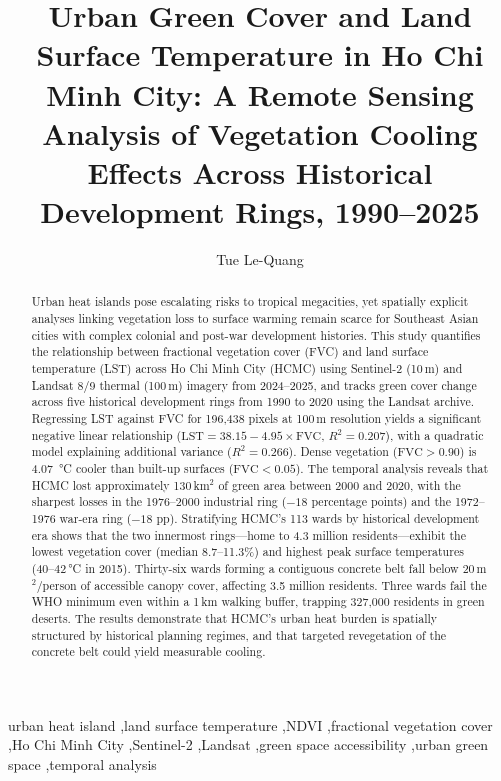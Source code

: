 \documentclass[preprint,12pt]{elsarticle}
\begin{document}
\begin{frontmatter}

\title{Urban Green Cover and Land Surface Temperature in Ho Chi Minh City: A Remote Sensing Analysis of Vegetation Cooling Effects Across Historical Development Rings, 1990--2025}

\author[fulbright]{Tue Le-Quang}

\address[fulbright]{Urban Social Economics Research Group, Fulbright University Vietnam, Ho Chi Minh City, Vietnam}

\begin{abstract}
Urban heat islands pose escalating risks to tropical megacities, yet spatially explicit analyses linking vegetation loss to surface warming remain scarce for Southeast Asian cities with complex colonial and post-war development histories. This study quantifies the relationship between fractional vegetation cover (FVC) and land surface temperature (LST) across Ho Chi Minh City (HCMC) using Sentinel-2 (10\,m) and Landsat 8/9 thermal (100\,m) imagery from 2024--2025, and tracks green cover change across five historical development rings from 1990 to 2020 using the Landsat archive. Regressing LST against FVC for 196,438 pixels at 100\,m resolution yields a significant negative linear relationship ($\text{LST} = 38.15 - 4.95 \times \text{FVC}$, $R^2 = 0.207$), with a quadratic model explaining additional variance ($R^2 = 0.266$). Dense vegetation ($\text{FVC} > 0.90$) is \SI{4.07}{\degreeCelsius} cooler than built-up surfaces ($\text{FVC} < 0.05$). The temporal analysis reveals that HCMC lost approximately 130\,km$^2$ of green area between 2000 and 2020, with the sharpest losses in the 1976--2000 industrial ring ($-18$ percentage points) and the 1972--1976 war-era ring ($-18$ pp). Stratifying HCMC's 113 wards by historical development era shows that the two innermost rings---home to 4.3 million residents---exhibit the lowest vegetation cover (median 8.7--11.3\%) and highest peak surface temperatures (40--42\,\si{\degreeCelsius} in 2015). Thirty-six wards forming a contiguous concrete belt fall below 20\,m$^2$/person of accessible canopy cover, affecting 3.5 million residents. Three wards fail the WHO minimum even within a 1\,km walking buffer, trapping 327,000 residents in green deserts. The results demonstrate that HCMC's urban heat burden is spatially structured by historical planning regimes, and that targeted revegetation of the concrete belt could yield measurable cooling.
\end{abstract}

\begin{keyword}
urban heat island \sep land surface temperature \sep NDVI \sep fractional vegetation cover \sep Ho Chi Minh City \sep Sentinel-2 \sep Landsat \sep green space accessibility \sep urban green space \sep temporal analysis
\end{keyword}

\end{frontmatter}
\end{document}
